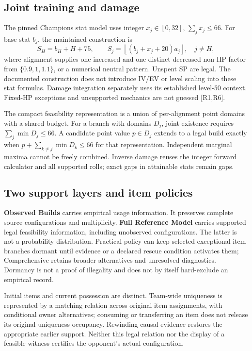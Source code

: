 \documentclass[10pt,a4paper]{article}
\begin{document}
\subsection{Joint training and damage}
The pinned Champions stat model uses integer $x_j\in[0,32]$, $\sum_jx_j\leq66$. For base stat $b_j$, the maintained construction is
\begin{equation}
 S_H=b_H+H+75,\qquad S_j=\left\lfloor(b_j+x_j+20)a_j\right\rfloor,\quad j\ne H,
\end{equation}
where alignment supplies one increased and one distinct decreased non-HP factor from $\{0.9,1,1.1\}$, or a numerical neutral pattern. Unspent SP are legal. The documented construction does not introduce IV/EV or level scaling into these stat formulas. Damage integration separately uses its established level-50 context. Fixed-HP exceptions and unsupported mechanics are not guessed [R1,R6].

The compact feasibility representation is a union of per-alignment point domains with a shared budget. For a branch with domains $D_j$, joint existence requires $\sum_j\min D_j\leq66$. A candidate point value $p\in D_j$ extends to a legal build exactly when $p+\sum_{k\ne j}\min D_k\leq66$ for that representation. Independent marginal maxima cannot be freely combined. Inverse damage reuses the integer forward calculator and all supported rolls; exact gaps in attainable stats remain gaps.

\subsection{Two support layers and item policies}
\textbf{Observed Builds} carries empirical usage information. It preserves complete source configurations and multiplicity. \textbf{Full Reference Model} carries supported legal feasibility information, including unobserved configurations. The latter is not a probability distribution. Practical policy can keep selected exceptional item branches dormant until evidence or a declared rescue condition activates them; Comprehensive retains broader alternatives and unresolved diagnostics. Dormancy is not a proof of illegality and does not by itself hard-exclude an empirical record.

Initial items and current possession are distinct. Team-wide uniqueness is represented by a matching relation across original item assignments, with conditional owner alternatives; consuming or transferring an item does not release its original uniqueness occupancy. Rewinding causal evidence restores the appropriate earlier support. Neither this legal relation nor the display of a feasible witness certifies the opponent's actual configuration.
\clearpage
\end{document}
